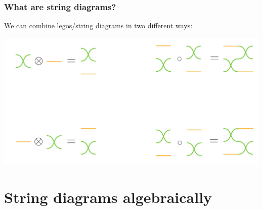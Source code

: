 \documentclass[t, pdftex]{beamer}
\begin{document}
\begin{frame}
    \frametitle{What are string diagrams?}
    We can combine legos/string diagrams in two different ways:
    \begin{center}
        \includegraphics[width=\textwidth,keepaspectratio]{figures/lego3.pdf}
    \end{center}
\end{frame}

\section{String diagrams algebraically}
\end{document}
